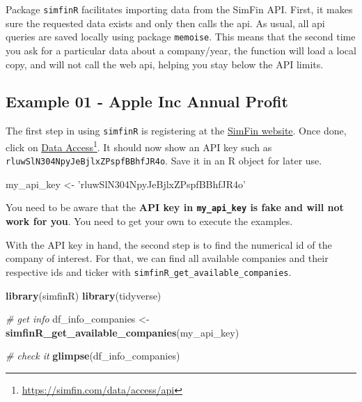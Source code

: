 \documentclass[
  12pt,
]{book}
\newenvironment{Shaded}{\begin{snugshade}}{\end{snugshade}}
\newcommand{\CommentTok}[1]{\textcolor[rgb]{0.37,0.37,0.37}{\textit{#1}}}
\newcommand{\KeywordTok}[1]{\textcolor[rgb]{0.27,0.27,0.27}{\textbf{#1}}}
\newcommand{\NormalTok}[1]{#1}
\newcommand{\StringTok}[1]{\textcolor[rgb]{0.5,0.5,0.5}{#1}}
\begin{document}
Package \texttt{simfinR} facilitates importing data from the SimFin API. First, it makes sure the requested data exists and only then calls the api. As usual, all api queries are saved locally using package \texttt{memoise}. This means that the second time you ask for a particular data about a company/year, the function will load a local copy, and will not call the web api, helping you stay below the API limits.

\hypertarget{example-01---apple-inc-annual-profit}{%
\subsection{Example 01 - Apple Inc Annual Profit}\label{example-01---apple-inc-annual-profit}}

The first step in using \texttt{simfinR} is registering at the \href{https://simfin.com/}{SimFin website}. Once done, click on \href{https://simfin.com/data/access/api}{Data Access}\footnote{\url{https://simfin.com/data/access/api}}. It should now show an API key such as \texttt{\textquotesingle{}rluwSlN304NpyJeBjlxZPspfBBhfJR4o\textquotesingle{}}. Save it in an R object for later use.

\begin{Shaded}
\begin{Highlighting}[]
\NormalTok{my_api_key <-}\StringTok{ 'rluwSlN304NpyJeBjlxZPspfBBhfJR4o'}
\end{Highlighting}
\end{Shaded}

You need to be aware that the \textbf{API key in \texttt{my\_api\_key} is fake and will not work for you}. You need to get your own to execute the examples.

With the API key in hand, the second step is to find the numerical id of the company of interest. For that, we can find all available companies and their respective ids and ticker with \texttt{simfinR\_get\_available\_companies}.

\begin{Shaded}
\begin{Highlighting}[]
\KeywordTok{library}\NormalTok{(simfinR)}
\KeywordTok{library}\NormalTok{(tidyverse)}

\CommentTok{# get info}
\NormalTok{df_info_companies <-}\StringTok{ }\KeywordTok{simfinR_get_available_companies}\NormalTok{(my_api_key)}

\CommentTok{# check it}
\KeywordTok{glimpse}\NormalTok{(df_info_companies)}
\end{Highlighting}
\end{Shaded}
\end{document}
